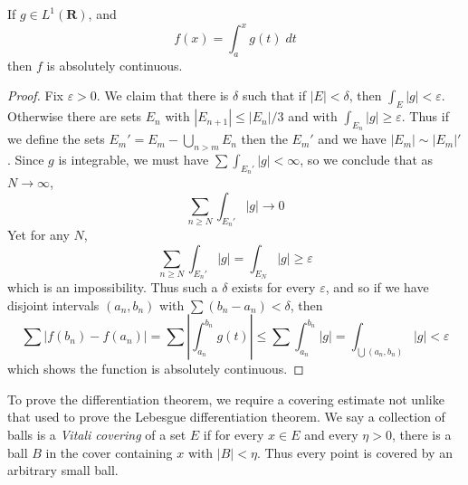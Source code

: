 \begin{theorem}
  If $g \in L^1(\mathbf{R})$, and
  \[ f(x) = \int_a^x g(t)\; dt \]
  then $f$ is absolutely continuous.
\end{theorem}
\begin{proof}
  Fix $\varepsilon > 0$. We claim that there is $\delta$ such that if $|E| < \delta$, then $\int_E |g| < \varepsilon$. Otherwise there are sets $E_n$ with $|E_{n+1}| \leq |E_n|/3$ and with $\int_{E_n} |g| \geq \varepsilon$. Thus if we define the sets $E_m' = E_m - \bigcup_{n > m} E_n$ then the $E_m'$ and we have $|E_m| \sim |E_m|'$. Since $g$ is integrable, we must have $\sum \int_{E_n'} |g| < \infty$, so we conclude that as $N \to \infty$,
  \[ \sum_{n \geq N} \int_{E_n'} |g| \to 0 \]
  Yet for any $N$,
  \[ \sum_{n \geq N} \int_{E_n'} |g| = \int_{E_N} |g| \geq \varepsilon \]
  which is an impossibility. Thus such a $\delta$ exists for every $\varepsilon$, and so if we have disjoint intervals $(a_n,b_n)$ with $\sum (b_n - a_n) < \delta$, then
  \[ \sum |f(b_n) - f(a_n)| = \sum \left| \int_{a_n}^{b_n} g(t) \right| \leq \sum \int_{a_n}^{b_n} |g| = \int_{\bigcup (a_n,b_n)} |g| < \varepsilon \]
  which shows the function is absolutely continuous.
\end{proof}

To prove the differentiation theorem, we require a covering estimate not unlike that used to prove the Lebesgue differentiation theorem. We say a collection of balls is a \emph{Vitali covering} of a set $E$ if for every $x \in E$ and every $\eta > 0$, there is a ball $B$ in the cover containing $x$ with $|B| < \eta$. Thus every point is covered by an arbitrary small ball.

